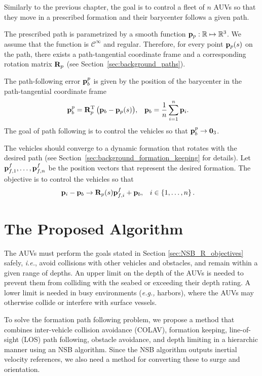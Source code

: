 Similarly to the previous chapter, the goal is to control a fleet of $n$ AUVs so that they move in a prescribed formation and their barycenter follows a given path.

The prescribed path is parametrized by a smooth function $\mathbf{p}_p: \mathbb{R} \mapsto \mathbb{R}^3$.
We assume that the function is $\mathcal{C}^{\infty}$ and regular.
Therefore, for every point $\mathbf{p}_p(s)$ on the path, there exists a path-tangential coordinate frame and a corresponding rotation matrix $\mathbf{R}_p$ (see Section~\ref{sec:background_paths}).

The path-following error $\mathbf{p}_b^p$ is given by the position of the barycenter in the path-tangential coordinate frame 
\begin{align}
    \mathbf{p}_b^p &= \mathbf{R}_p^{\mathrm{T}} \, \big(\mathbf{p}_b - \mathbf{p}_p(s)\big), &
    \mathbf{p}_b &= \frac{1}{n} \sum_{i=1}^n \mathbf{p}_i.
    \label{eq:NSB_R_barycenter}
\end{align}
The goal of path following is to control the vehicles so that $\mathbf{p}_b^p \rightarrow \mathbf{0}_3$.

The vehicles should converge to a dynamic formation that rotates with the desired path (see Section~\ref{sec:background_formation_keeping} for details).
Let $\mathbf{p}_{f,1}^f, \ldots, \mathbf{p}_{f,n}^f$ be the position vectors that represent the desired formation.
The objective is to control the vehicles so that
\begin{align}
    \mathbf{p}_i - \mathbf{p}_b &\rightarrow \mathbf{R}_p(s) \mathbf{p}_{f,i}^f + \mathbf{p}_b, &
    i &\in \left\{1, \ldots, n \right\}.
\end{align}

\section{The Proposed Algorithm}
\label{sec:NSB_R_control}

The AUVs must perform the goals stated in Section \ref{sec:NSB_R_objectives} safely, \emph{i.e.},
avoid collisions with other vehicles and obstacles, and remain within a given range of depths.
An upper limit on the depth of the AUVs is needed to prevent them from colliding with the seabed or exceeding their depth rating.
A lower limit is needed in busy environments (\emph{e.g.,} harbors), where the AUVs may otherwise collide or interfere with surface vessels.

To solve the formation path following problem, we propose a method that combines inter-vehicle collision avoidance (COLAV), formation keeping, line-of-sight (LOS) path following, obstacle avoidance, and depth limiting in a hierarchic manner using an NSB algorithm.
Since the NSB algorithm outputs inertial velocity references, we also need a method for converting these to surge and orientation.

